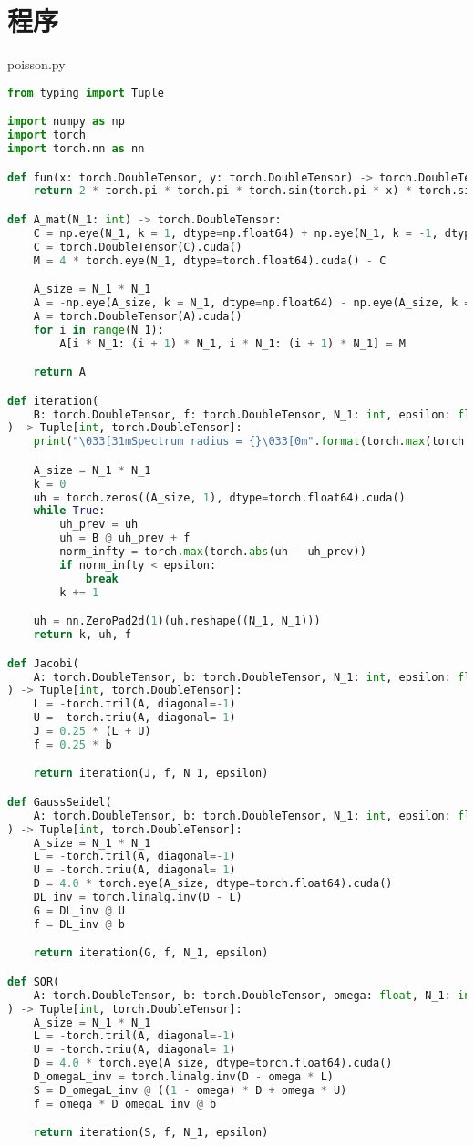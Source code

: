 \documentclass{article}
\begin{document}
\section{程序}
poisson.py
\begin{lstlisting}[language=Python]
from typing import Tuple

import numpy as np
import torch
import torch.nn as nn

def fun(x: torch.DoubleTensor, y: torch.DoubleTensor) -> torch.DoubleTensor:
    return 2 * torch.pi * torch.pi * torch.sin(torch.pi * x) * torch.sin(torch.pi * y)

def A_mat(N_1: int) -> torch.DoubleTensor:
    C = np.eye(N_1, k = 1, dtype=np.float64) + np.eye(N_1, k = -1, dtype=np.float64)
    C = torch.DoubleTensor(C).cuda()
    M = 4 * torch.eye(N_1, dtype=torch.float64).cuda() - C

    A_size = N_1 * N_1
    A = -np.eye(A_size, k = N_1, dtype=np.float64) - np.eye(A_size, k = -N_1, dtype=np.float64)
    A = torch.DoubleTensor(A).cuda()
    for i in range(N_1):
        A[i * N_1: (i + 1) * N_1, i * N_1: (i + 1) * N_1] = M

    return A

def iteration(
    B: torch.DoubleTensor, f: torch.DoubleTensor, N_1: int, epsilon: float
) -> Tuple[int, torch.DoubleTensor]:
    print("\033[31mSpectrum radius = {}\033[0m".format(torch.max(torch.abs(torch.linalg.eigvals(B)))))

    A_size = N_1 * N_1
    k = 0
    uh = torch.zeros((A_size, 1), dtype=torch.float64).cuda()
    while True:
        uh_prev = uh
        uh = B @ uh_prev + f
        norm_infty = torch.max(torch.abs(uh - uh_prev))
        if norm_infty < epsilon:
            break
        k += 1

    uh = nn.ZeroPad2d(1)(uh.reshape((N_1, N_1)))
    return k, uh, f

def Jacobi(
    A: torch.DoubleTensor, b: torch.DoubleTensor, N_1: int, epsilon: float
) -> Tuple[int, torch.DoubleTensor]:
    L = -torch.tril(A, diagonal=-1)
    U = -torch.triu(A, diagonal= 1)
    J = 0.25 * (L + U)
    f = 0.25 * b

    return iteration(J, f, N_1, epsilon)

def GaussSeidel(
    A: torch.DoubleTensor, b: torch.DoubleTensor, N_1: int, epsilon: float
) -> Tuple[int, torch.DoubleTensor]:
    A_size = N_1 * N_1
    L = -torch.tril(A, diagonal=-1)
    U = -torch.triu(A, diagonal= 1)
    D = 4.0 * torch.eye(A_size, dtype=torch.float64).cuda()
    DL_inv = torch.linalg.inv(D - L)
    G = DL_inv @ U
    f = DL_inv @ b

    return iteration(G, f, N_1, epsilon)

def SOR(
    A: torch.DoubleTensor, b: torch.DoubleTensor, omega: float, N_1: int, epsilon: float
) -> Tuple[int, torch.DoubleTensor]:
    A_size = N_1 * N_1
    L = -torch.tril(A, diagonal=-1)
    U = -torch.triu(A, diagonal= 1)
    D = 4.0 * torch.eye(A_size, dtype=torch.float64).cuda()
    D_omegaL_inv = torch.linalg.inv(D - omega * L)
    S = D_omegaL_inv @ ((1 - omega) * D + omega * U)
    f = omega * D_omegaL_inv @ b

    return iteration(S, f, N_1, epsilon)
\end{lstlisting}
\end{document}
